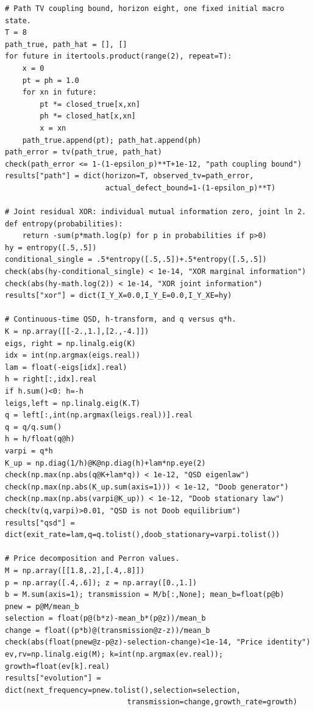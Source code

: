 \documentclass[
  11pt,
  oneside]{book}
\begin{document}
\begin{verbatim}
# Path TV coupling bound, horizon eight, one fixed initial macro state.
T = 8
path_true, path_hat = [], []
for future in itertools.product(range(2), repeat=T):
    x = 0
    pt = ph = 1.0
    for xn in future:
        pt *= closed_true[x,xn]
        ph *= closed_hat[x,xn]
        x = xn
    path_true.append(pt); path_hat.append(ph)
path_error = tv(path_true, path_hat)
check(path_error <= 1-(1-epsilon_p)**T+1e-12, "path coupling bound")
results["path"] = dict(horizon=T, observed_tv=path_error,
                       actual_defect_bound=1-(1-epsilon_p)**T)

# Joint residual XOR: individual mutual information zero, joint ln 2.
def entropy(probabilities):
    return -sum(p*math.log(p) for p in probabilities if p>0)
hy = entropy([.5,.5])
conditional_single = .5*entropy([.5,.5])+.5*entropy([.5,.5])
check(abs(hy-conditional_single) < 1e-14, "XOR marginal information")
check(abs(hy-math.log(2)) < 1e-14, "XOR joint information")
results["xor"] = dict(I_Y_X=0.0,I_Y_E=0.0,I_Y_XE=hy)

# Continuous-time QSD, h-transform, and q versus q*h.
K = np.array([[-2.,1.],[2.,-4.]])
eigs, right = np.linalg.eig(K)
idx = int(np.argmax(eigs.real))
lam = float(-eigs[idx].real)
h = right[:,idx].real
if h.sum()<0: h=-h
leigs,left = np.linalg.eig(K.T)
q = left[:,int(np.argmax(leigs.real))].real
q = q/q.sum()
h = h/float(q@h)
varpi = q*h
K_up = np.diag(1/h)@K@np.diag(h)+lam*np.eye(2)
check(np.max(np.abs(q@K+lam*q)) < 1e-12, "QSD eigenlaw")
check(np.max(np.abs(K_up.sum(axis=1))) < 1e-12, "Doob generator")
check(np.max(np.abs(varpi@K_up)) < 1e-12, "Doob stationary law")
check(tv(q,varpi)>0.01, "QSD is not Doob equilibrium")
results["qsd"] = dict(exit_rate=lam,q=q.tolist(),doob_stationary=varpi.tolist())

# Price decomposition and Perron values.
M = np.array([[1.8,.2],[.4,.8]])
p = np.array([.4,.6]); z = np.array([0.,1.])
b = M.sum(axis=1); transmission = M/b[:,None]; mean_b=float(p@b)
pnew = p@M/mean_b
selection = float(p@(b*z)-mean_b*(p@z))/mean_b
change = float((p*b)@(transmission@z-z))/mean_b
check(abs(float(pnew@z-p@z)-selection-change)<1e-14, "Price identity")
ev,rv=np.linalg.eig(M); k=int(np.argmax(ev.real)); growth=float(ev[k].real)
results["evolution"] = dict(next_frequency=pnew.tolist(),selection=selection,
                            transmission=change,growth_rate=growth)


\end{verbatim}
\end{document}
